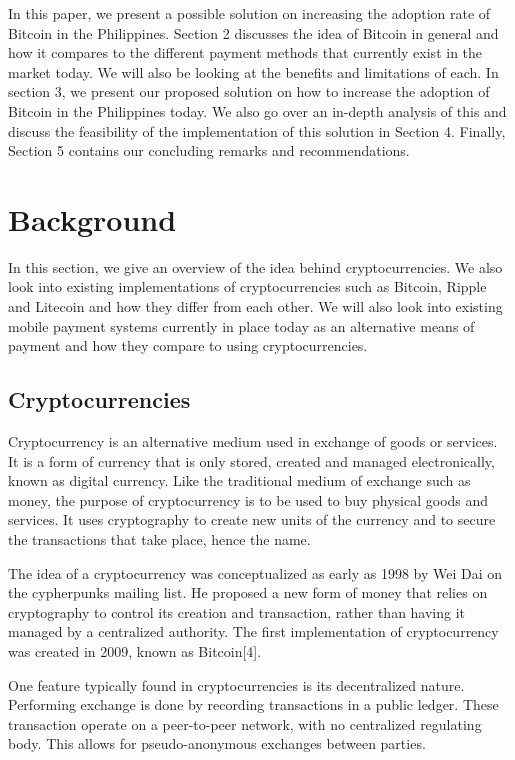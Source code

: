 \documentclass{acm_proc_article-sp}
\begin{document}
In this paper, we present a possible solution on increasing the adoption rate of Bitcoin in the Philippines. Section 2 discusses the idea of Bitcoin in general and how it compares to the different payment methods that currently exist in the market today. We will also be looking at the benefits and limitations of each. In section 3, we present our proposed solution on how to increase the adoption of Bitcoin in the Philippines today. We also go over an in-depth analysis of this and discuss the feasibility of the implementation of this solution in Section 4. Finally, Section 5 contains our concluding remarks and recommendations.


\section{Background}

In this section, we give an overview of the idea behind cryptocurrencies. We also look into existing implementations of cryptocurrencies such as Bitcoin, Ripple and Litecoin and how they differ from each other. We will also look into existing mobile payment systems currently in place today as an alternative means of payment and how they compare to using cryptocurrencies.

\subsection{Cryptocurrencies}
Cryptocurrency is an alternative medium used in exchange of goods or services. It is a form of currency that is only stored, created and managed electronically, known as digital currency. Like the traditional medium of exchange such as money, the purpose of cryptocurrency is to be used to buy physical goods and services. It uses cryptography to create new units of the currency and to secure the transactions that take place, hence the name.

The idea of a cryptocurrency was conceptualized as early as 1998 by Wei Dai on the cypherpunks mailing list. He proposed a new form of money that relies on cryptography to control its creation and transaction, rather than having it managed by a centralized authority. The first implementation of cryptocurrency was created in 2009, known as Bitcoin[4].


One feature typically found in cryptocurrencies is its decentralized nature. Performing exchange is done by recording transactions in a public ledger. These transaction operate on a peer-to-peer network, with no centralized regulating body. This allows for pseudo-anonymous exchanges between parties.
\end{document}
